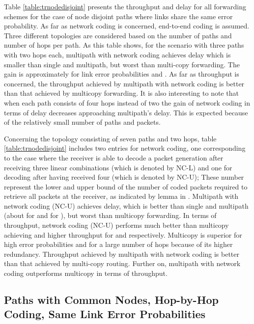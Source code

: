 \documentclass[journal, onecolumn, 12pt]{IEEEtran}
\begin{document}
Table \ref{table:trnodedisjoint} presents the throughput and delay for all forwarding schemes for the case of node disjoint paths where links share the same error probability.
As far as network coding is concerned, end-to-end  coding is assumed.
Three different topologies are considered based on the number of paths and number of hops per path.
As this table shows, for the scenario with three paths with two hops each, multipath with network coding achieves delay which is smaller than single and multipath, but worst than multi-copy forwarding.
The gain is approximately  for link error probabilities  and .
As far as throughput is concerned, the throughput achieved by multipath with network coding is better than that achieved by multicopy forwarding.
It is also interesting to note that when each path consists of four hops instead of two the gain of network coding in terms of delay decreases approaching multipath's delay.
This is expected because of the relatively small number of paths and packets.

Concerning the topology consisting of seven paths and two hops, table \ref{table:trnodedisjoint} includes two entries for network coding, one corresponding to the
case where the receiver is able to decode a packet generation after receiving three linear combinations (which is denoted by NC-L) and one for decoding after having received four (which is denoted by NC-U);
These number represent the lower and upper bound of the number of coded packets required to retrieve all packets at the receiver, as indicated by lemma in \cite{b:pathdivgain1}.
Multipath with network coding (NC-U) achieves delay, which is better than single and multipath (about  for  and  for ), but worst than multicopy forwarding.
In terms of throughput, network coding (NC-U) performs much better than multicopy achieving  and  higher throughput for  and  respectively.
Multicopy is superior for high error probabilities and for a large number of hops because of its higher redundancy.
Throughput achieved by multipath with network coding is better than that achieved by multi-copy routing.
Further on, multipath with network coding outperforms multicopy in terms of throughput.

\subsection{Paths with Common Nodes, Hop-by-Hop Coding, Same Link Error Probabilities}
\label{sec:numerical_hopbyhop}
\end{document}
